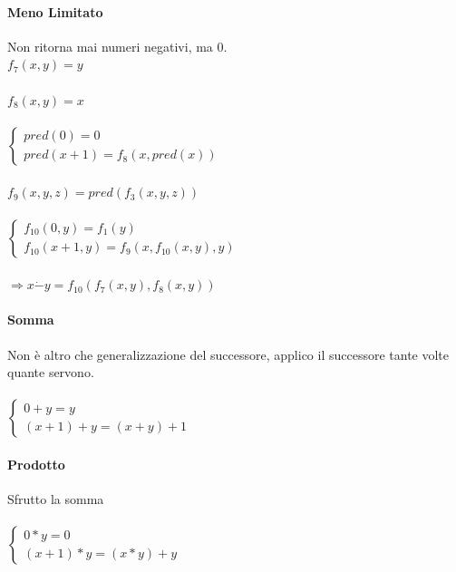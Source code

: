 \documentclass[10pt]{book}
\begin{document}
\begin{multicols}{2}
\paragraph{Meno Limitato} Non ritorna mai numeri negativi, ma 0.\\
$f_7(x, y) = y$\\\\
$f_8(x, y) = x$\\\\
\begin{math}
		\left\{
		\begin{array}{l}
			pred(0) = 0\\
			pred(x + 1) = f_8(x, pred(x))
		\end{array}
		\right.
\end{math}\\\\
$f_9(x, y, z) = pred(f_3(x, y, z))$\\\\
\begin{math}
		\left\{
		\begin{array}{l}
			f_{10}(0, y) = f_1(y)\\
			f_{10}(x + 1, y) = f_9(x, f_{10}(x, y), y)
		\end{array}
		\right.
\end{math}\\\\
$\Rightarrow x \dot{-} y = f_{10}(f_7(x, y), f_8(x, y))$
\columnbreak
\paragraph{Somma}
Non è altro che generalizzazione del successore, applico il successore tante volte quante servono.\\\\
\begin{math}
		\left\{
		\begin{array}{l}
			0 + y = y\\
			(x + 1) + y = (x + y) + 1
		\end{array}
		\right.
\end{math}
\paragraph{Prodotto}
Sfrutto la somma\\\\
\begin{math}
		\left\{
		\begin{array}{l}
			0 * y = 0\\
			(x + 1) * y = (x * y) + y
		\end{array}
		\right.
\end{math}

\end{multicols}
\end{document}
